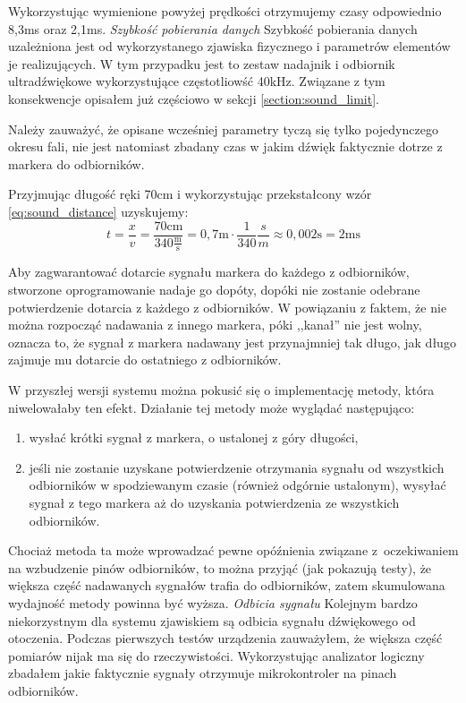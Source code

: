 Wykorzystując wymienione powyżej prędkości otrzymujemy czasy odpowiednio 8,3ms oraz 2,1ms.
\newline
\newline
\textsl{Szybkość pobierania danych}
Szybkość pobierania danych uzależniona jest od wykorzystanego zjawiska fizycznego i parametrów elementów je realizujących. W tym przypadku jest to zestaw nadajnik i odbiornik ultradźwiękowe wykorzystujące częstotliowść 40kHz. Związane z tym konsekwencje opisałem już częściowo w sekcji \ref{section:sound_limit}.

Należy zauważyć, że opisane wcześniej parametry tyczą się tylko pojedynczego okresu fali, nie jest natomiast zbadany czas w jakim dźwięk faktycznie dotrze z markera do odbiorników.

Przyjmując długość ręki 70cm i wykorzystując przekstałcony wzór \ref{eq:sound_distance} uzyskujemy:
\begin{equation}
 t = \frac{x}{v} = \frac{70\textrm{cm}}{340\frac{\textrm{m}}{\textrm{s}}} = 0,7\textrm{m} \cdot \frac{1}{340}\frac{s}{m} \approx 0,002\textrm{s} = 2\textrm{ms}
 \label{eq:reporting_speed}
\end{equation}

Aby zagwarantować dotarcie sygnału markera do każdego z odbiorników, stworzone oprogramowanie nadaje go dopóty, dopóki nie zostanie odebrane potwierdzenie dotarcia z każdego z odbiorników. W powiązaniu z faktem, że nie można rozpocząć nadawania z innego markera, póki ,,kanał'' nie jest wolny, oznacza to, że sygnał z markera nadawany jest przynajmniej tak długo, jak długo zajmuje mu dotarcie do ostatniego z odbiorników.

W przyszłej wersji systemu można pokusić się o implementację metody, która niwelowałaby ten efekt. Działanie tej metody może wyglądać następująco:
\begin{enumerate}
 \item wysłać krótki sygnał z markera, o ustalonej z góry długości,
 \item jeśli nie zostanie uzyskane potwierdzenie otrzymania sygnału od wszystkich odbiorników w spodziewanym czasie (również odgórnie ustalonym), wysyłać sygnał z tego markera aż do uzyskania potwierdzenia ze wszystkich odbiorników.
\end{enumerate}

Chociaż metoda ta może wprowadzać pewne opóźnienia związane z~oczekiwaniem na wzbudzenie pinów odbiorników, to można przyjąć (jak pokazują testy), że większa część nadawanych sygnałów trafia do odbiorników, zatem skumulowana wydajność metody powinna być wyższa.
\newline
\newline
\textsl{Odbicia sygnału}
Kolejnym bardzo niekorzystnym dla systemu zjawiskiem są odbicia sygnału dźwiękowego od otoczenia. Podczas pierwszych testów urządzenia zauważyłem, że większa część pomiarów nijak ma się do rzeczywistości. Wykorzystując analizator logiczny zbadałem jakie faktycznie sygnały otrzymuje mikrokontroler na pinach odbiorników.

